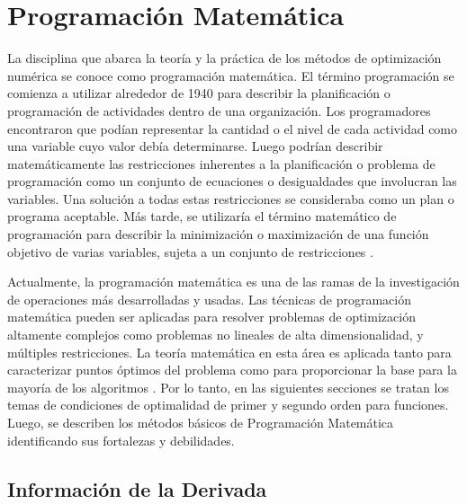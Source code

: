 
\chapter{Programación Matemática} %

\label{Chapter3} %
La disciplina que abarca la teoría y la práctica de los métodos de optimización numérica se conoce como programación matemática\cite{antoniou_practical_2007}. El término programación se comienza a utilizar alrededor de 1940 para describir la planificación o programación de actividades dentro de una organización. Los programadores encontraron que podían representar la cantidad o el nivel de cada actividad como una variable cuyo valor debía determinarse. Luego podrían describir matemáticamente las restricciones inherentes a la planificación o problema de programación como un conjunto de ecuaciones o desigualdades que involucran las variables. Una solución a todas estas restricciones se consideraba como un plan o programa aceptable. Más tarde, se utilizaría el término matemático
de programación para describir la minimización o maximización de una
función objetivo de varias variables, sujeta a un conjunto de restricciones \cite{takriti1994ampl}. 

Actualmente, la programación matemática es una de las ramas de la investigación de operaciones más desarrolladas y usadas. Las técnicas de programación matemática pueden ser aplicadas para resolver  problemas de optimización altamente complejos como problemas no lineales de alta dimensionalidad, y múltiples restricciones. La teoría matemática en esta área es aplicada tanto para caracterizar puntos óptimos del problema como para proporcionar la base para la mayoría de los algoritmos \cite{nocedal2006numerical}. Por lo tanto, en las siguientes secciones se tratan los temas de condiciones de optimalidad de primer y segundo orden para funciones. Luego, se describen los métodos básicos de Programación Matemática identificando sus fortalezas y debilidades.

\section{Información de la Derivada}

